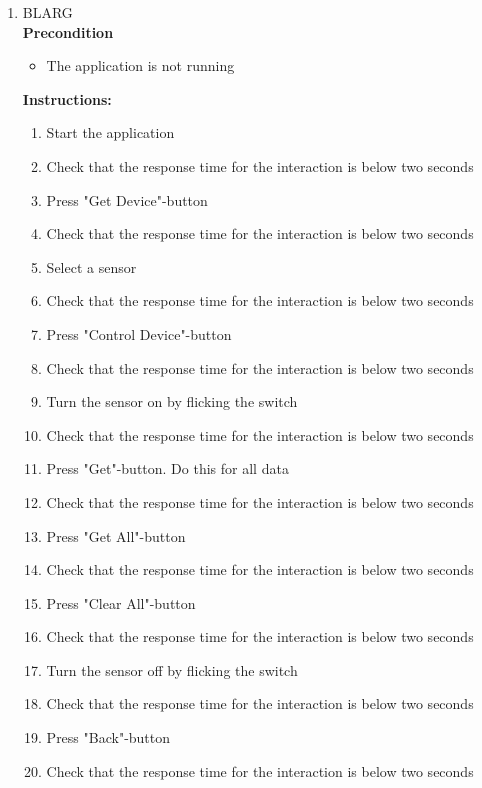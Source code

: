\documentclass[a4paper]{article}
\newlength{\testlabellength}
\newenvironment{testlist}{\begin{enumerate}[label=\bfseries Instruction \thesubsection.\arabic* , labelindent=0pt, labelwidth=\testlabellength , leftmargin=2cm]}{\end{enumerate}}
\newenvironment{precondition}{
{\color{white}BLARG}\\ 
\textbf{Precondition}
\begin{itemize}[labelindent=0cm, labelwidth=2cm , leftmargin=1cm]
}
{\end{itemize}}
\newenvironment{instruction}{
\textbf{Instructions:}
\begin{enumerate}[label=\bfseries  \arabic*., labelindent=0cm, labelwidth=2cm , leftmargin=1cm]
}
{\end{enumerate}}
\begin{document}
\begin{appendices}
\begin{testlist}

	\item
		\begin{precondition}
			\item The application is not running
		\end{precondition}
		\begin{instruction}
			\item Start the application
			\item Check that the response time for the interaction is below two seconds
            \item Press "Get Device"-button
            \item Check that the response time for the interaction is below two seconds
            \item Select a sensor
            \item Check that the response time for the interaction is below two seconds
            \item Press "Control Device"-button
            \item Check that the response time for the interaction is below two seconds
            \item Turn the sensor on by flicking the switch
            \item Check that the response time for the interaction is below two seconds
            \item Press "Get"-button. Do this for all data
            \item Check that the response time for the interaction is below two seconds
            \item Press "Get All"-button
            \item Check that the response time for the interaction is below two seconds
            \item Press "Clear All"-button
            \item Check that the response time for the interaction is below two seconds
            \item Turn the sensor off by flicking the switch
            \item Check that the response time for the interaction is below two seconds
            \item Press "Back"-button
            \item Check that the response time for the interaction is below two seconds

\end{instruction}
\end{testlist}
\end{appendices}
\end{document}
